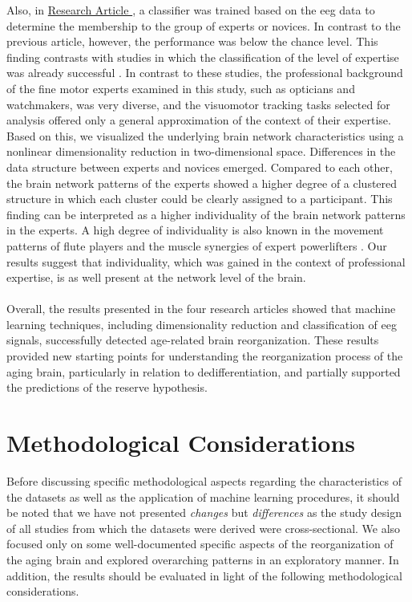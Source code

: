 Also, in \hyperref[results:paperIV]{Research Article }, a classifier was trained based on the \gls{eeg} data to determine the membership to the group of experts or novices. In contrast to the previous article, however, the performance was below the chance level. This finding contrasts with studies in which the classification of the level of expertise was already successful \cite{Hosp2021, Winkler-Schwartz2019, Shourie2016}. In contrast to these studies, the professional background of the fine motor experts examined in this study, such as opticians and watchmakers, was very diverse, and the visuomotor tracking tasks selected for analysis offered only a general approximation of the context of their expertise. Based on this, we visualized the underlying brain network characteristics using a nonlinear dimensionality reduction in two-dimensional space. Differences in the data structure between experts and novices emerged. Compared to each other, the brain network patterns of the experts showed a higher degree of a clustered structure in which each cluster could be clearly assigned to a participant. This finding can be interpreted as a higher individuality of the brain network patterns in the experts. A high degree of individuality is also known in the movement patterns of flute players and the muscle synergies of expert powerlifters \cite{Albrecht2014, Caramiaux2018, Kristiansen2015}. Our results suggest that individuality, which was gained in the context of professional expertise, is as well present at the network level of the brain.\\
\\
Overall, the results presented in the four research articles showed that machine learning techniques, including dimensionality reduction and classification of \gls{eeg} signals, successfully detected age-related brain reorganization. These results provided new starting points for understanding the reorganization process of the aging brain, particularly in relation to dedifferentiation, and partially supported the predictions of the reserve hypothesis.

\section{Methodological Considerations}
Before discussing specific methodological aspects regarding the characteristics of the datasets as well as the application of machine learning procedures, it should be noted that we have not presented \textit{changes} but \textit{differences} as the study design of all studies from which the datasets were derived were cross-sectional. We also focused only on some well-documented specific aspects of the reorganization of the aging brain and explored overarching patterns in an exploratory manner. In addition, the results should be evaluated in light of the following methodological considerations. 

